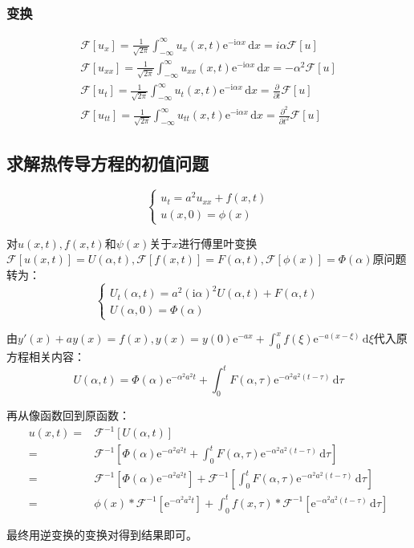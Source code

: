 \subsubsection{变换}
\begin{gather*}
\mathscr{F}\left[u_x\right]=\frac{1}{\sqrt{2\pi}}\int_{-\infty}^{\infty} u_x(x,t)\mathrm{e}^{-\mathrm{i}\alpha x}\,\mathrm{d}x=i\alpha\mathscr{F}[u]\\
\mathscr{F}\left[u_{xx}\right]=\frac{1}{\sqrt{2\pi}}\int_{-\infty}^{\infty} u_{xx}(x,t)\mathrm{e}^{-\mathrm{i}\alpha x}\,\mathrm{d}x=-\alpha^2\mathscr{F}[u]\\
\mathscr{F}\left[u_t\right]=\frac{1}{\sqrt{2\pi}}\int_{-\infty}^{\infty} u_t(x,t)\mathrm{e}^{-\mathrm{i}\alpha x}\,\mathrm{d}x=\frac{\partial}{\partial t}\mathscr{F}[u]\\
\mathscr{F}\left[u_{tt}\right]=\frac{1}{\sqrt{2\pi}}\int_{-\infty}^{\infty} u_{tt}(x,t)\mathrm{e}^{-\mathrm{i}\alpha x}\,\mathrm{d}x=\frac{\partial^2}{\partial t^2}\mathscr{F}[u]
\end{gather*}

\subsection{求解热传导方程的初值问题}
\[\begin{cases}
u_t=a^2u_{xx}+f(x,t)\\
u(x,0)=\phi(x)
\end{cases}\]

对\(u(x,t),f(x,t)\)和\(\psi(x)\)关于\(x\)进行傅里叶变换\(\mathscr{F}[u(x,t)]=U(\alpha,t),\mathscr{F}[f(x,t)]=F(\alpha,t),\mathscr{F}[\phi(x)]=\Phi(\alpha)\)原问题转为：
\[\begin{cases}
U_t(\alpha,t)=a^2(\mathrm{i}\alpha)^2U(\alpha,t)+F(\alpha,t)\\
U(\alpha,0)=\Phi(\alpha)
\end{cases}\]

由\(y'(x)+ay(x)=f(x),y(x)=y(0)\mathrm{e}^{-ax}+\int_0^xf(\xi)\mathrm{e}^{-a(x-\xi)}\,\mathrm{d}\xi\)代入原方程相关内容：
\[
U(\alpha,t)=\Phi(\alpha)\mathrm{e}^{-\alpha^2a^2t}+\int_{0}^{t} F(\alpha,\tau)\mathrm{e}^{-\alpha^2a^2(t-\tau)}\,\mathrm{d}\tau
\]

再从像函数回到原函数：
\begin{align*}
u(x,t)=&\mathscr{F}^{-1}[U(\alpha,t)]\\
=&\mathscr{F}^{-1}\left[\Phi(\alpha)\mathrm{e}^{-\alpha^2a^2t}+\int_{0}^{t} F(\alpha,\tau)\mathrm{e}^{-\alpha^2a^2(t-\tau)}\,\mathrm{d}\tau\right]\\
=&\mathscr{F}^{-1}\left[\Phi(\alpha)\mathrm{e}^{-\alpha^2a^2t}\right]+\mathscr{F}^{-1}\left[\int_{0}^{t} F(\alpha,\tau)\mathrm{e}^{-\alpha^2a^2(t-\tau)}\,\mathrm{d}\tau\right]\\
=&\phi(x)*\mathscr{F}^{-1}\left[\mathrm{e}^{-\alpha^2a^2t}\right]+\int_{0}^{t}f(x,\tau)*\mathscr{F}^{-1}\left[\mathrm{e}^{-\alpha^2a^2(t-\tau)}\,\mathrm{d}\tau\right]
\end{align*}

最终用逆变换的变换对得到结果即可。